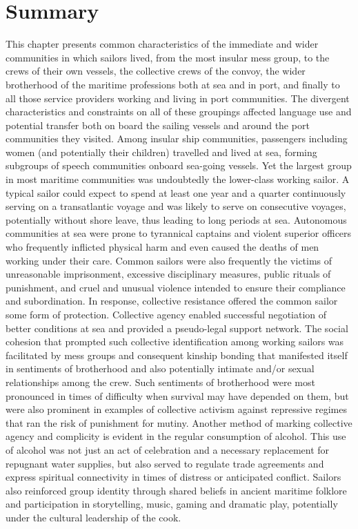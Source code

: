 \section{\textbf{Summary}}%

This chapter presents common characteristics of the immediate and wider communities in which sailors lived, from the most insular mess group, to the crews of their own vessels, the collective crews of the convoy, the wider brotherhood of the maritime professions both at sea and in port, and finally to all those service providers working and living in port communities. The divergent characteristics and constraints on all of these groupings affected language use and potential transfer both on board the sailing vessels and around the port communities they visited. Among insular ship communities, passengers including women (and potentially their children) travelled and lived at sea, forming subgroups of speech communities onboard sea-going vessels. Yet the largest group in most maritime communities was undoubtedly the lower-class working sailor. A typical sailor could expect to spend at least one year and a quarter continuously serving on a transatlantic voyage and was likely to serve on consecutive voyages, potentially without shore leave, thus leading to long periods at sea. Autonomous communities at sea were prone to tyrannical captains and violent superior officers who frequently inflicted physical harm and even caused the deaths of men working under their care. Common sailors were also frequently the victims of unreasonable imprisonment, excessive disciplinary measures, public rituals of punishment, and cruel and unusual violence intended to ensure their compliance and subordination. In response, collective resistance offered the common sailor some form of protection. Collective agency enabled successful negotiation of better conditions at sea and provided a pseudo-legal support network. The social cohesion that prompted such collective identification among working sailors was facilitated by mess groups and consequent kinship bonding that manifested itself in sentiments of brotherhood and also potentially intimate and/or sexual relationships among the crew. Such sentiments of brotherhood were most pronounced in times of difficulty when survival may have depended on them, but were also prominent in examples of collective activism against repressive regimes that ran the risk of punishment for mutiny. Another method of marking collective agency and complicity is evident in the regular consumption of alcohol. This use of alcohol was not just an act of celebration and a necessary replacement for repugnant water supplies, but also served to regulate trade agreements and express spiritual connectivity in times of distress or anticipated conflict. Sailors also reinforced group identity through shared beliefs in ancient maritime folklore and participation in storytelling, music, gaming and dramatic play, potentially under the cultural leadership of the cook. 

